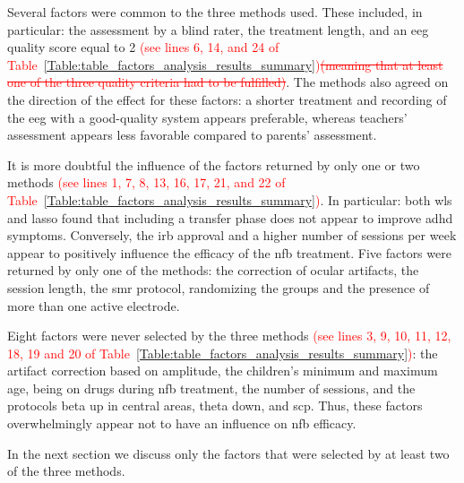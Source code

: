 Several factors were common to the three methods used. These included, in particular: the assessment 
by a blind rater, the treatment length, and an \gls{eeg} quality score equal to 2 \textcolor{red}{(see lines 6, 14, and 24 of 
Table~\ref{Table:table_factors_analysis_results_summary})}\textcolor{red}{\sout{(meaning that at least one of the three quality criteria had to be fulfilled)}}.
The methods also agreed on the direction of the effect for these factors: 
a shorter treatment and recording of the \gls{eeg} with a good-quality system appears preferable, whereas teachers' assessment appears less favorable 
compared to parents' assessment.

It is more doubtful the influence of the factors returned by only one or two methods \textcolor{red}{(see lines 1, 7, 8, 13, 16, 17, 21, and 22 
of Table~\ref{Table:table_factors_analysis_results_summary})}. In particular: 
both \gls{wls} and \gls{lasso} found that including a transfer phase does not appear to improve \gls{adhd} symptoms. 
Conversely, the \gls{irb} approval and a higher number of sessions per week appear to positively influence the efficacy of the \gls{nfb} treatment. 
Five factors were returned by only one of the methods: the correction of ocular artifacts, the session length, the \gls{smr} protocol, 
randomizing the groups and the presence of more than one active electrode.  

Eight factors were never selected by the three methods \textcolor{red}{(see lines 3, 9, 10, 11, 12, 18, 19 and 20 of 
Table~\ref{Table:table_factors_analysis_results_summary})}: the artifact correction based on amplitude, the children's minimum and maximum age, 
being on drugs during \gls{nfb} treatment, the number of sessions, and the protocols beta up in central areas, theta down, and \gls{scp}. 
Thus, these factors overwhelmingly appear not to have an influence on \gls{nfb} efficacy.  

In the next section we discuss only the factors that were selected by at least two of the three methods. 

